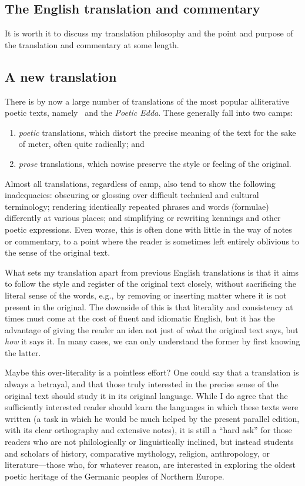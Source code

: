   \subsection{The English translation and commentary}

    It is worth it to discuss my translation philosophy and the point and purpose of the translation and commentary at some length.

    \subsection{A new translation}

    There is by now a large number of translations of the most popular alliterative poetic texts, namely \Beowulf\ and the \emph{Poetic Edda}.  These generally fall into two camps:
    \begin{enumerate}
      \item \emph{poetic} translations, which distort the precise meaning of the text for the sake of meter, often quite radically; and
      \item \emph{prose} translations, which nowise preserve the style or feeling of the original.
    \end{enumerate}

    Almost all translations, regardless of camp, also tend to show the following inadequacies: obscuring or glossing over difficult technical and cultural terminology; rendering identically repeated phrases and words (formulae) differently at various places; and simplifying or rewriting kennings and other poetic expressions.  Even worse, this is often done with little in the way of notes or commentary, to a point where the reader is sometimes left entirely oblivious to the sense of the original text.

    What sets my translation apart from previous English translations is that it aims to follow the style and register of the original text closely, without sacrificing the literal sense of the words, e.g., by removing or inserting matter where it is not present in the original.  The downside of this is that literality and consistency at times must come at the cost of fluent and idiomatic English, but it has the advantage of giving the reader an idea not just of \emph{what} the original text says, but \emph{how} it says it.  In many cases, we can only understand the former by first knowing the latter.

    Maybe this over-literality is a pointless effort?  One could say that a translation is always a betrayal, and that those truly interested in the precise sense of the original text should study it in its original language.  While I do agree that the sufficiently interested reader should learn the languages in which these texts were written (a task in which he would be much helped by the present parallel edition, with its clear orthography and extensive notes), it is still a “hard ask” for those readers who are not philologically or linguistically inclined, but instead students and scholars of history, comparative mythology, religion, anthropology, or literature---those who, for whatever reason, are interested in exploring the oldest poetic heritage of the Germanic peoples of Northern Europe.

